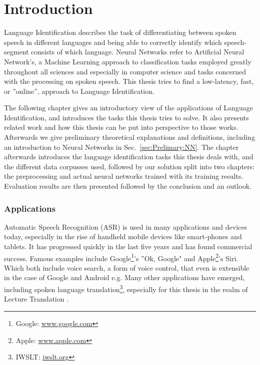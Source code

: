 
\chapter{Introduction}
\label{ch:Introduction}
Language Identification describes the task of differentiating between spoken speech in different languages and being able to correctly identify which speech-segment consists of which language.  Neural Networks refer to Artificial Neural Network's, a Machine Learning approach to classification tasks employed greatly throughout all sciences and especially in computer science and tasks concerned with the processing on spoken speech. This thesis tries to find a low-latency, fast, or ''online'', approach to Language Identification. 

The following chapter gives an introductory view of the applications of Language Identification, and introduces the tasks this thesis tries to solve. It also presents related work and how this thesis can be put into perspective to those works. Afterwards we give preliminary theoretical explanations and definitions, including an introduction to Neural Networks in Sec.~\ref{sec:Prelimary:NN}. The chapter afterwards introduces the language identification tasks this thesis deals with, and the different data corpusses used, followed by our solution split into two chapters: the preprocessing and actual neural networks trained with its training results. Evaluation results are then presented followed by the conclusion and an outlook.
\subsection{Applications}
\label{sec:Introduction:Apps}
Automatic Speech Recognition (ASR) is used in many applications and devices today, especially in the rise of handheld mobile devices like smart-phones and tablets. It has progressed quickly in the last five years and has found commercial success. Famous examples include Google\footnote{Google: \url{www.google.com}}'s ''Ok, Google" and Apple\footnote{Apple: \url{www.apple.com}}'s Siri. Which both include voice search\cite{franz2008voice}, a form of voice control, that even is extensible in the case of Google and Android e.g\cite{voicecontrol2014}. Many other applications have emerged, including spoken language translation\footnote{IWSLT: \url{iwslt.org}}, especially for this thesis in the realm of Lecture Translation\cite{lecturetranslator2016} .

